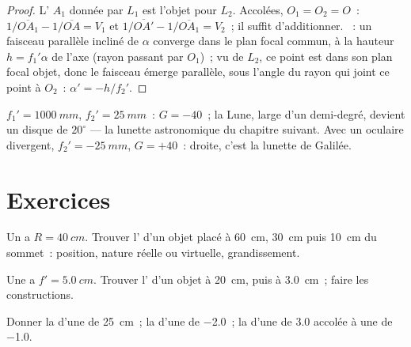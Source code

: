 \begin{proof}
L' $A_1$ donnée par $L_1$ est l'objet pour $L_2$. Accolées,
$O_1 = O_2 = O$~: $1/\overline{OA_1} - 1/\overline{OA} = V_1$ et
$1/\overline{OA'} - 1/\overline{OA_1} = V_2$~; il suffit d'additionner.
~: un faisceau parallèle incliné de $\alpha$ converge dans
le plan focal commun, à la hauteur $h = f_1'\alpha$ de l'axe (rayon
passant par $O_1$)~; vu de $L_2$, ce point est dans son plan focal
objet, donc le faisceau émerge parallèle, sous l'angle du rayon qui joint
ce point à $O_2$~: $\alpha' = -h/f_2'$.
\end{proof}

\begin{example}\label{ex:b1:mirrors-thin-lenses:afocal}
$f_1' = \qty{1000}{mm}$, $f_2' = \qty{25}{mm}$~: $G = -40$~; la Lune,
large d'un demi-degré, devient un disque de $20^\circ$ --- la lunette
astronomique du chapitre suivant. Avec un oculaire divergent,
$f_2' = \qty{-25}{mm}$, $G = +40$~:  droite, c'est la lunette de
Galilée.
\end{example}

\section{Exercices}

\begin{exercise}[$\star$]\label{exo:b1:mirrors-thin-lenses:1}
Un  a $R = \qty{40}{cm}$. Trouver l' d'un objet placé
à \qty{60}{cm}, \qty{30}{cm} puis \qty{10}{cm} du sommet~: position,
nature réelle ou virtuelle, grandissement.
\end{exercise}

\begin{exercise}[$\star$]\label{exo:b1:mirrors-thin-lenses:2}
Une  a $f' = \qty{5.0}{cm}$. Trouver l' d'un
objet à \qty{20}{cm}, puis à \qty{3.0}{cm}~; faire les constructions.
\end{exercise}

\begin{exercise}[$\star$]\label{exo:b1:mirrors-thin-lenses:3}
Donner la  d'une  de  \qty{25}{cm}~; la
 d'une  de \qty{-2.0}{\delta}~; la  d'une  de \qty{+3.0}{\delta} accolée à une  de
\qty{-1.0}{\delta}.
\end{exercise}

